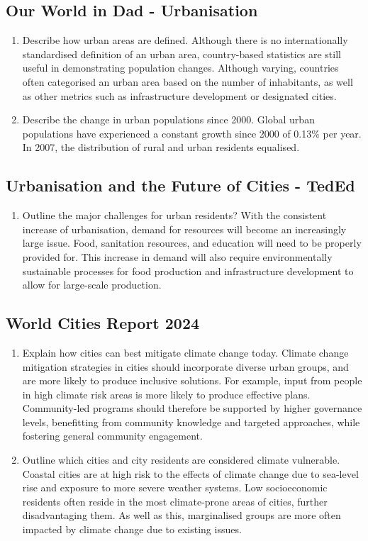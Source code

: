 	\subsection{Our World in Dad - Urbanisation}
		\begin{enumerate}
			\item Describe how urban areas are defined.
				\subitem Although there is no internationally standardised definition of an urban area, country-based statistics are still useful in demonstrating population changes. Although varying, countries often categorised an urban area based on the number of inhabitants, as well as other metrics such as infrastructure development or designated cities.
			\item Describe the change in urban populations since 2000.
				\subitem Global urban populations have experienced a constant growth since 2000 of 0.13\% per year. In 2007, the distribution of rural and urban residents equalised.
		\end{enumerate}
	\subsection{Urbanisation and the Future of Cities - TedEd}
		\begin{enumerate}
			\item Outline the major challenges for urban residents?
				\subitem With the consistent increase of urbanisation, demand for resources will become an increasingly large issue. Food, sanitation resources, and education will need to be properly provided for. This increase in demand will also require environmentally sustainable processes for food production and infrastructure development to allow for large-scale production. 
		\end{enumerate}
	\subsection{World Cities Report 2024}
		\begin{enumerate}
			\item Explain how cities can best mitigate climate change today.
				\subitem Climate change mitigation strategies in cities should incorporate diverse urban groups, and are more likely to produce inclusive solutions. For example, input from people in high climate risk areas is more likely to produce effective plans. Community-led programs should therefore be supported by higher governance levels, benefitting from community knowledge and targeted approaches, while fostering general community engagement.
			\item Outline which cities and city residents are considered climate vulnerable.
				\subitem Coastal cities are at high risk to the effects of climate change due to sea-level rise and exposure to more severe weather systems. Low socioeconomic residents often reside in the most climate-prone areas of cities, further disadvantaging them. As well as this, marginalised groups are more often impacted by climate change due to existing issues.
		\end{enumerate}
